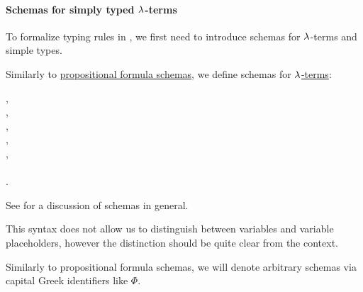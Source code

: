 \paragraph{Schemas for simply typed \( \synlambda \)-terms}\hfill

To formalize typing rules in , we first need to introduce schemas for \( \synlambda \)-terms and simple types.

\begin{definition}\label{def:lambda_term_schema}
  Similarly to \hyperref[def:propositional_formula_schema]{propositional formula schemas}, we define schemas for \hyperref[def:lambda_term]{\( \synlambda \)-terms}:
  \begin{bnf*}
     {}, \\
         {}, \\
              { \bnfor {}}, \\
       {\bnftsq{\( ( \)} \bnfsp {} \bnfsp {} \bnfsp \bnftsq{\( ) \)}}, \\
       {\bnftsq{\( ( \)} \bnfsp \bnftsq{\( \synlambda \)} \bnfsp {} \bnfsp {} \bnfsp {} \bnfsp \bnftsq{\( ) \)}}, \\
              { \bnfor {} \bnfor} \\
    .
  \end{bnf*}
\end{definition}
\begin{comments}
  \item See  for a discussion of schemas in general.

  \item This syntax does not allow us to distinguish between variables and variable placeholders, however the distinction should be quite clear from the context.

  \item Similarly to propositional formula schemas, we will denote arbitrary schemas via capital Greek identifiers like \( \Phi \).
\end{comments}

